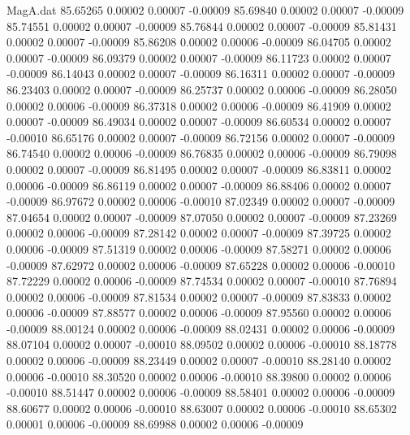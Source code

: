 \begin{filecontents}{MagA.dat}
  85.65265    0.00002    0.00007   -0.00009
  85.69840    0.00002    0.00007   -0.00009
  85.74551    0.00002    0.00007   -0.00009
  85.76844    0.00002    0.00007   -0.00009
  85.81431    0.00002    0.00007   -0.00009
  85.86208    0.00002    0.00006   -0.00009
  86.04705    0.00002    0.00007   -0.00009
  86.09379    0.00002    0.00007   -0.00009
  86.11723    0.00002    0.00007   -0.00009
  86.14043    0.00002    0.00007   -0.00009
  86.16311    0.00002    0.00007   -0.00009
  86.23403    0.00002    0.00007   -0.00009
  86.25737    0.00002    0.00006   -0.00009
  86.28050    0.00002    0.00006   -0.00009
  86.37318    0.00002    0.00006   -0.00009
  86.41909    0.00002    0.00007   -0.00009
  86.49034    0.00002    0.00007   -0.00009
  86.60534    0.00002    0.00007   -0.00010
  86.65176    0.00002    0.00007   -0.00009
  86.72156    0.00002    0.00007   -0.00009
  86.74540    0.00002    0.00006   -0.00009
  86.76835    0.00002    0.00006   -0.00009
  86.79098    0.00002    0.00007   -0.00009
  86.81495    0.00002    0.00007   -0.00009
  86.83811    0.00002    0.00006   -0.00009
  86.86119    0.00002    0.00007   -0.00009
  86.88406    0.00002    0.00007   -0.00009
  86.97672    0.00002    0.00006   -0.00010
  87.02349    0.00002    0.00007   -0.00009
  87.04654    0.00002    0.00007   -0.00009
  87.07050    0.00002    0.00007   -0.00009
  87.23269    0.00002    0.00006   -0.00009
  87.28142    0.00002    0.00007   -0.00009
  87.39725    0.00002    0.00006   -0.00009
  87.51319    0.00002    0.00006   -0.00009
  87.58271    0.00002    0.00006   -0.00009
  87.62972    0.00002    0.00006   -0.00009
  87.65228    0.00002    0.00006   -0.00010
  87.72229    0.00002    0.00006   -0.00009
  87.74534    0.00002    0.00007   -0.00010
  87.76894    0.00002    0.00006   -0.00009
  87.81534    0.00002    0.00007   -0.00009
  87.83833    0.00002    0.00006   -0.00009
  87.88577    0.00002    0.00006   -0.00009
  87.95560    0.00002    0.00006   -0.00009
  88.00124    0.00002    0.00006   -0.00009
  88.02431    0.00002    0.00006   -0.00009
  88.07104    0.00002    0.00007   -0.00010
  88.09502    0.00002    0.00006   -0.00010
  88.18778    0.00002    0.00006   -0.00009
  88.23449    0.00002    0.00007   -0.00010
  88.28140    0.00002    0.00006   -0.00010
  88.30520    0.00002    0.00006   -0.00010
  88.39800    0.00002    0.00006   -0.00010
  88.51447    0.00002    0.00006   -0.00009
  88.58401    0.00002    0.00006   -0.00009
  88.60677    0.00002    0.00006   -0.00010
  88.63007    0.00002    0.00006   -0.00010
  88.65302    0.00001    0.00006   -0.00009
  88.69988    0.00002    0.00006   -0.00009

\end{filecontents}
